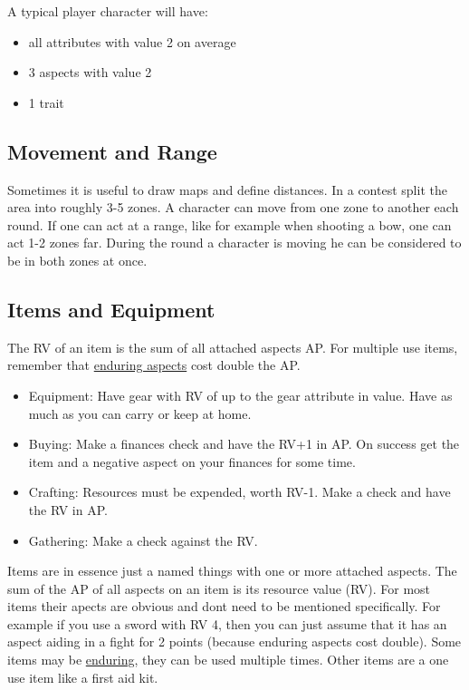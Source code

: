 \documentclass[11pt]{article}
\begin{document}
{\begin{short}
A typical player character will have:
\begin{itemize}
\item all attributes with value 2 on average
\item 3 aspects with value 2
\item 1 trait
\end{itemize}
\end{short}
\subsection{Movement and Range}
\label{sec:org5281e6f}
\begin{short}
Sometimes it is useful to draw maps and define distances. In a contest split the area into roughly 3-5 zones. A character can move from one zone to another each round. If one can act at a range, like for example when shooting a bow, one can act 1-2 zones far. During the round a character is moving he can be considered to be in both zones at once.
\end{short}
\subsection{Items and Equipment}
\label{sec:orgb5d89a7}
\begin{short}
The RV of an item is the sum of all attached aspects AP. For multiple use items, remember that \hyperref[sec:orgcdb4f3f]{enduring aspects} cost double the AP.
\begin{itemize}
\item Equipment: Have gear with RV of up to the gear attribute in value. Have as much as you can carry or keep at home.
\item Buying: Make a finances check and have the RV+1 in AP. On success get the item and a negative aspect  on your finances for some time.
\item Crafting: Resources must be expended, worth RV-1. Make a check and have the RV in AP.
\item Gathering: Make a check against the RV.
\end{itemize}
\end{short}

Items are in essence just a named things with one or more attached aspects. The sum of the AP of all aspects on an item is its resource value (RV). For most items their apects are obvious and dont need to be mentioned specifically. For example if you use a sword with RV 4, then you can just assume that it has an aspect aiding in a fight for 2 points (because enduring aspects cost double). Some items may be \hyperref[sec:orgcdb4f3f]{enduring}, they can be used multiple times. Other items are a one use item like a first aid kit. 

}
\end{document}
